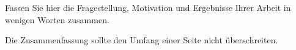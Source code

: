 Fassen Sie hier die Fragestellung, Motivation und Ergebnisse Ihrer Arbeit
in wenigen Worten zusammen.

Die Zusammenfassung sollte den Umfang einer Seite nicht überschreiten.
